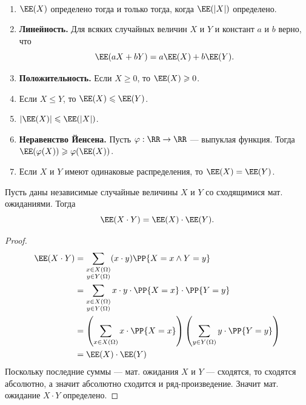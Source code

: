 \documentclass[12pt,a4paper]{article}
\begin{document}
    \begin{lemma}\ 
        \begin{enumerate}
            \item $\EE(X)$ определено тогда и только тогда, когда $\EE(|X|)$ определено.
            \item \textbf{Линейность.} Для всяких случайных величин $X$ и $Y$ и констант $a$ и $b$ верно, что
                \[\EE(aX + bY) = a \EE(X) + b \EE(Y).\]
            \item \textbf{Положительность.} Если $X \geqslant 0$, то $\EE(X) \geqslant 0$.
            \item Если $X \leqslant Y$, то $\EE(X) \leqslant \EE(Y)$.
            \item $|\EE(X)| \leqslant \EE(|X|)$.
            \item \textbf{Неравенство Йенсена.} Пусть $\varphi: \RR \to \RR$ --- выпуклая функция. Тогда $\EE(\varphi(X)) \geqslant \varphi(\EE(X))$.
            \item Если $X$ и $Y$ имеют одинаковые распределения, то $\EE(X) = \EE(Y)$.
        \end{enumerate}
    \end{lemma}

    \begin{theorem}
        Пусть даны независимые случайные величины $X$ и $Y$ со сходящимися мат. ожиданиями. Тогда
        \[\EE(X \cdot Y) = \EE(X) \cdot \EE(Y).\]
    \end{theorem}

    \begin{proof}
        \begin{align*}
            \EE(X \cdot Y)
            &= \sum_{\substack{x \in X(\Omega)\\ y \in Y(\Omega)}} (x \cdot y) \PP\{X = x \wedge Y = y\}\\
            &= \sum_{\substack{x \in X(\Omega)\\ y \in Y(\Omega)}} x \cdot y \cdot \PP\{X = x\} \cdot \PP\{Y = y\}\\
            &= \left(\sum_{x \in X(\Omega)} x \cdot \PP\{X = x\}\right) \left(\sum_{y \in Y(\Omega)} y \cdot \PP\{Y = y\}\right)\\
            &= \EE(X) \cdot \EE(Y)\\
        \end{align*}
        Поскольку последние суммы --- мат. ожидания $X$ и $Y$ --- сходятся, то сходятся абсолютно, а значит абсолютно сходится и ряд-произведение. Значит мат. ожидание $X \cdot Y$ определено. 
    \end{proof}
\end{document}
